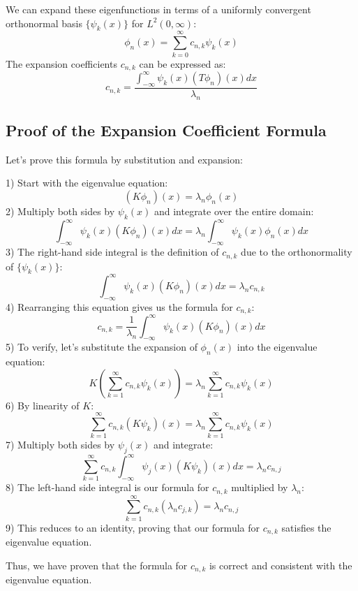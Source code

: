 \documentclass{article}
\begin{document}
We can expand these eigenfunctions in terms of a uniformly convergent
orthonormal basis $\{\psi_k (x)\}$ for $L^2 (0, \infty)$:
\begin{equation}
  \phi_n (x) = \sum_{k = 0}^{\infty} c_{n, k} \psi_k (x)
\end{equation}
The expansion coefficients $c_{n, k}$ can be expressed as:
\begin{equation}
  c_{n, k} = \frac{\int_{- \infty}^{\infty} \psi_k (x)  (T \phi_n) (x)
  dx}{\lambda_n} 
\end{equation}

\subsection{Proof of the Expansion Coefficient Formula}

Let's prove this formula by substitution and expansion:

1) Start with the eigenvalue equation:
\[ (K \phi_n) (x) = \lambda_n \phi_n (x) \]
2) Multiply both sides by $\psi_k (x)$ and integrate over the entire domain:
\[ \int_{- \infty}^{\infty} \psi_k (x)  (K \phi_n) (x) dx = \lambda_n  \int_{-
   \infty}^{\infty} \psi_k (x) \phi_n (x) dx \]
3) The right-hand side integral is the definition of $c_{n, k}$ due to the
orthonormality of $\{\psi_k (x)\}$:
\[ \int_{- \infty}^{\infty} \psi_k (x)  (K \phi_n) (x) dx = \lambda_n c_{n, k}
\]
4) Rearranging this equation gives us the formula for $c_{n, k}$:
\[ c_{n, k} = \frac{1}{\lambda_n}  \int_{- \infty}^{\infty} \psi_k (x)  (K
   \phi_n) (x) dx \]
5) To verify, let's substitute the expansion of $\phi_n (x)$ into the
eigenvalue equation:
\[ K \left( \sum_{k = 1}^{\infty} c_{n, k} \psi_k (x) \right) = \lambda_n 
   \sum_{k = 1}^{\infty} c_{n, k} \psi_k (x) \]
6) By linearity of $K$:
\[ \sum_{k = 1}^{\infty} c_{n, k}  (K \psi_k) (x) = \lambda_n  \sum_{k =
   1}^{\infty} c_{n, k} \psi_k (x) \]
7) Multiply both sides by $\psi_j (x)$ and integrate:
\[ \sum_{k = 1}^{\infty} c_{n, k}  \int_{- \infty}^{\infty} \psi_j (x)  (K
   \psi_k) (x) dx = \lambda_n c_{n, j} \]
8) The left-hand side integral is our formula for $c_{n, k}$ multiplied by
$\lambda_n$:
\[ \sum_{k = 1}^{\infty} c_{n, k}  (\lambda_n c_{j, k}) = \lambda_n c_{n, j}
\]
9) This reduces to an identity, proving that our formula for $c_{n, k}$
satisfies the eigenvalue equation.

Thus, we have proven that the formula for $c_{n, k}$ is correct and consistent
with the eigenvalue equation.
\end{document}
